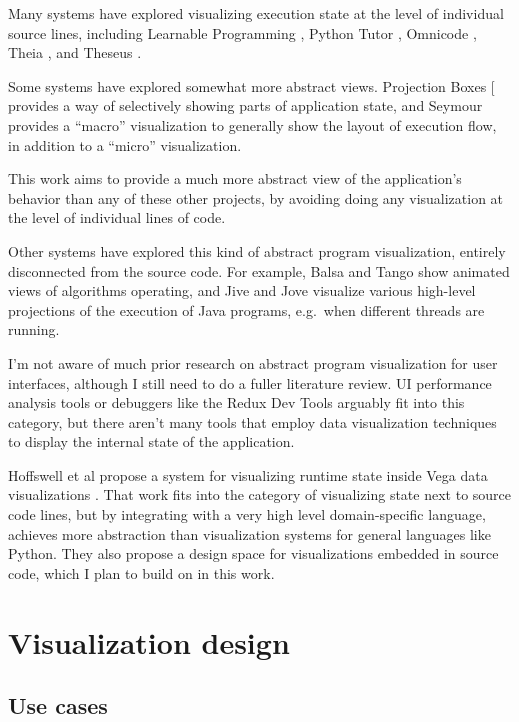 \documentclass{sigchi}
\begin{document}
Many systems have explored visualizing execution state at the level of
individual source lines, including Learnable Programming
\autocite{victora}, Python Tutor \autocite{guo2013}, Omnicode
\autocite{kang2017}, Theia \autocite{pollock2019}, and Theseus
\autocite{lieber2014}.

Some systems have explored somewhat more abstract views. Projection
Boxes {[}\textcite{lerner2020} provides a way of selectively showing
parts of application state, and Seymour \autocite{kasibatla2018}
provides a ``macro'' visualization to generally show the layout of
execution flow, in addition to a ``micro'' visualization.

This work aims to provide a much more abstract view of the application's
behavior than any of these other projects, by avoiding doing any
visualization at the level of individual lines of code.

Other systems have explored this kind of abstract program visualization,
entirely disconnected from the source code. For example, Balsa
\autocite{brown1984} and Tango \autocite{stasko1990} show animated views
of algorithms operating, and Jive \autocite{reiss2003} and Jove
\autocite{reiss2005} visualize various high-level projections of the
execution of Java programs, e.g.~when different threads are running.

I'm not aware of much prior research on abstract program visualization
for user interfaces, although I still need to do a fuller literature
review. UI performance analysis tools or debuggers like the Redux Dev
Tools arguably fit into this category, but there aren't many tools that
employ data visualization techniques to display the internal state of
the application.

Hoffswell et al propose a system for visualizing runtime state inside
Vega data visualizations \autocite{hoffswell2018a}. That work fits into
the category of visualizing state next to source code lines, but by
integrating with a very high level domain-specific language, achieves
more abstraction than visualization systems for general languages like
Python. They also propose a design space for visualizations embedded in
source code, which I plan to build on in this work.

\hypertarget{sec:design}{%
\section{Visualization design}\label{sec:design}}

\hypertarget{use-cases}{%
\subsection{Use cases}\label{use-cases}}
\end{document}
